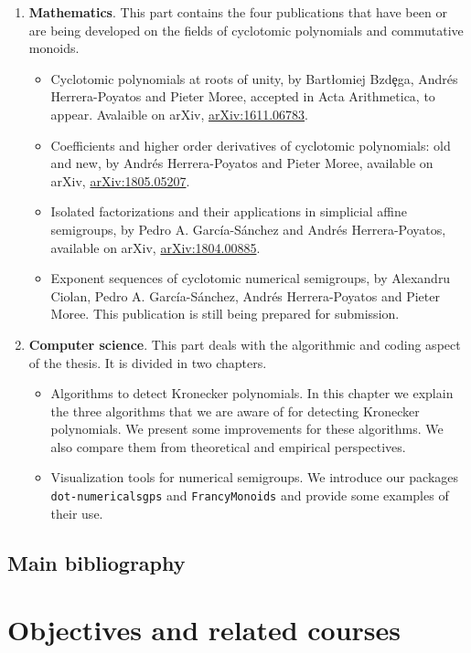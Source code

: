 \begin{enumerate}
\item \textbf{Mathematics}. This part contains the four publications that have been or are being developed on the fields of cyclotomic polynomials and commutative monoids.
  
\begin{itemize}
\item Cyclotomic polynomials at roots of unity, by Bart{\l}omiej Bzd\c{e}ga, Andrés Herrera-Poyatos and Pieter Moree, accepted in Acta Arithmetica, to appear. Avalaible on arXiv, \href{https://arxiv.org/abs/1611.06783}{arXiv:1611.06783}.
\item Coefficients and higher order derivatives of cyclotomic polynomials: old and new, by Andrés Herrera-Poyatos and Pieter Moree, available on arXiv, \href{https://arxiv.org/abs/1805.05207}{arXiv:1805.05207}.
\item Isolated factorizations and their applications in simplicial affine semigroups, by Pedro A. García-Sánchez and Andrés Herrera-Poyatos, available on arXiv, \href{https://arxiv.org/abs/1804.00885}{arXiv:1804.00885}.
\item Exponent sequences of cyclotomic numerical semigroups, by Alexandru Ciolan, Pedro A. García-Sánchez, Andrés Herrera-Poyatos and Pieter Moree. This publication is still being prepared for submission.
\end{itemize}
\item \textbf{Computer science}. This part deals with the algorithmic and coding aspect of the thesis. It is divided in two chapters.
\begin{itemize}
\item Algorithms to detect Kronecker polynomials. In this chapter we explain the three algorithms that we are aware of for detecting Kronecker polynomials. We present some improvements for these algorithms. We also compare them from theoretical and empirical perspectives.
\item Visualization tools for numerical semigroups. We introduce our packages \texttt{dot-numericalsgps} and \texttt{FrancyMonoids} and provide some examples of their use.
\end{itemize}
\end{enumerate}

\section{Main bibliography}

\chapter{Objectives and related courses}

